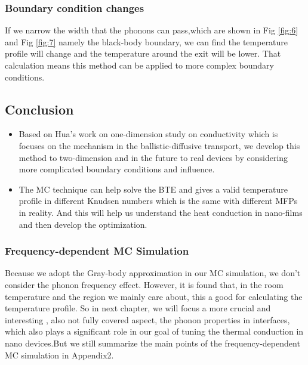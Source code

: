 \subsubsection*{Boundary condition changes}
If we narrow the width that the phonons can pass,which are shown in Fig \ref{fig:6} and Fig \ref{fig:7} namely the black-body boundary, we can find the temperature profile will change and the temperature around the exit will be lower. That calculation means this method can be applied to more complex boundary conditions.\\

\subsection{Conclusion}
\begin{itemize}
\item Based on Hua's work on one-dimension study on conductivity which is focuses on the mechanism in the ballistic-diffusive transport, we develop this method to two-dimension and in the future to real devices by considering more complicated boundary conditions and influence.
\item The MC technique can help solve the BTE and gives a valid temperature profile in different Knudsen numbers which is the same with different MFPs in reality. And this will help us understand the heat conduction in nano-films and then develop the optimization.
\end{itemize}

\subsubsection*{Frequency-dependent MC Simulation}
Because we adopt the Gray-body approximation in our MC simulation, we don't consider the phonon frequency effect. However, it is found that, in the room temperature and the region we mainly care about, this a good for calculating the temperature profile. So in next chapter, we will focus a more crucial and interesting , also not fully covered aspect, the phonon properties in interfaces, which also plays a significant role in our goal of tuning the thermal conduction in nano devices.But we still 
summarize the main points of the frequency-dependent MC simulation in Appendix2.





\clearpage



